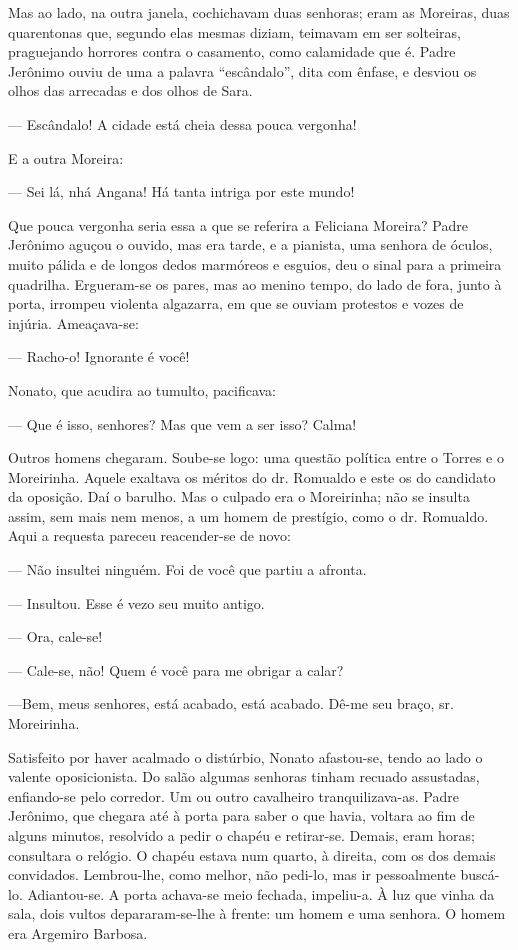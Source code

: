 Mas ao lado, na outra janela, cochichavam duas senhoras; eram as
Moreiras, duas quarentonas que, segundo elas mesmas diziam, teimavam em
ser solteiras, praguejando horrores contra o casamento, como calamidade
que é. Padre Jerônimo ouviu de uma a palavra ``escândalo'', dita com
ênfase, e desviou os olhos das arrecadas e dos olhos de Sara.

--- Escândalo! A cidade está cheia dessa pouca vergonha!

E a outra Moreira:

--- Sei lá, nhá Angana! Há tanta intriga por este mundo!

Que pouca vergonha seria essa a que se referira a Feliciana Moreira?
Padre Jerônimo aguçou o ouvido, mas era tarde, e a pianista, uma senhora
de óculos, muito pálida e de longos dedos marmóreos e esguios, deu o
sinal para a primeira quadrilha. Ergueram-se os pares, mas ao menino
tempo, do lado de fora, junto à porta, irrompeu violenta algazarra, em
que se ouviam protestos e vozes de injúria. Ameaçava-se:

--- Racho-o! Ignorante é você!

Nonato, que acudira ao tumulto, pacificava:

--- Que é isso, senhores? Mas que vem a ser isso? Calma!

Outros homens chegaram. Soube-se logo: uma questão política entre o
Torres e o Moreirinha. Aquele exaltava os méritos do dr. Romualdo e este
os do candidato da oposição. Daí o barulho. Mas o culpado era o
Moreirinha; não se insulta assim, sem mais nem menos, a um homem de
prestígio, como o dr. Romualdo. Aqui a requesta pareceu reacender-se de
novo:

--- Não insultei ninguém. Foi de você que partiu a afronta.

--- Insultou. Esse é vezo seu muito antigo.

--- Ora, cale-se!

--- Cale-se, não! Quem é você para me obrigar a calar?

---Bem, meus senhores, está acabado, está acabado. Dê-me seu braço, sr.
Moreirinha.

Satisfeito por haver acalmado o distúrbio, Nonato afastou-se, tendo ao
lado o valente oposicionista. Do salão algumas senhoras tinham recuado
assustadas, enfiando-se pelo corredor. Um ou outro cavalheiro
tranquilizava-as. Padre Jerônimo, que chegara até à porta para saber o
que havia, voltara ao fim de alguns minutos, resolvido a pedir o chapéu
e retirar-se. Demais, eram horas; consultara o relógio. O chapéu estava
num quarto, à direita, com os dos demais convidados. Lembrou-lhe, como
melhor, não pedi-lo, mas ir pessoalmente buscá-lo. Adiantou-se. A porta
achava-se meio fechada, impeliu-a. À luz que vinha da sala, dois vultos
depararam-se-lhe à frente: um homem e uma senhora. O homem era Argemiro
Barbosa.

